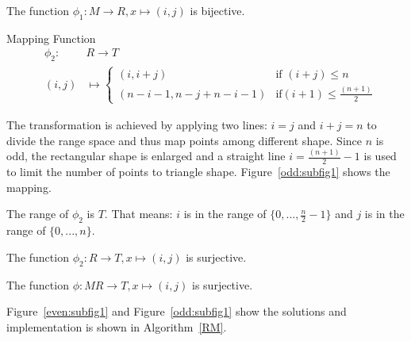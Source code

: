 \documentclass[AMA,LATO1COL]{WileyNJD-v2-bak}
\begin{document}
\vspace{5mm}
\begin{lemma}
The function $\phi_1:   M \rightarrow  R,x \mapsto (i,j)$ is bijective.
\end{lemma}
\vspace{5mm}
\begin{definition}
Mapping Function
\begin{eqnarray}
&\phi_2:& R\rightarrow T\\
&(i,j)&\mapsto
  \begin{cases}
   (i,i+j) &\text {if } (i+j) \leq n \\
   (n-i-1,n-j+n-i-1) & \text {if}(i+1) \leq \frac{(n+1)}{2}
  \end{cases}
\end{eqnarray}
\end{definition}
The transformation is achieved by applying two lines: $i=j$ and $i+j=n$ to divide the range space and thus map points among different shape. Since $n$ is odd, the rectangular shape is enlarged and a straight line $i= \frac{(n+1)}{2}-1$ is used to limit the number of points to triangle shape. Figure~\ref{odd:subfig1} shows the mapping.
\vspace{5mm}
\begin{lemma}
The range of $\phi_2$ is $T$. That means: $i$ is in the range of  $\{0,...,\frac{n}{2}-1\}$ and $j$ is in the range of $\{0,...,n\}$.
\end{lemma}
\vspace{5mm}
\begin{lemma}
The function $\phi_2:   R \rightarrow  T,x \mapsto (i,j)$ is surjective.
\end{lemma}
\vspace{5mm}
\begin{corollary}
The function $\phi:   M  R \rightarrow  T,x \mapsto (i,j)$ is surjective.
\end{corollary}


Figure~\ref{even:subfig1} and Figure~\ref{odd:subfig1} show the solutions and implementation is shown in Algorithm~\ref{RM}.
\end{document}
